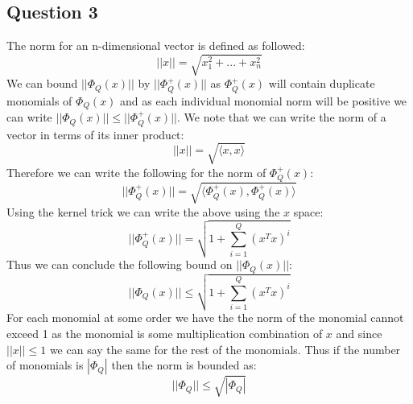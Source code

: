 \documentclass{article}
\begin{document}
\subsection{Question 3}
The norm for an n-dimensional vector is defined as followed:
$$
|| x || = \sqrt{x_1^2 + ... + x_n^2}
$$
We can bound $||\Phi_Q(x)||$ by $||\Phi^+_Q(x)||$ as $\Phi^+_Q(x)$ will contain duplicate monomials of $\Phi_Q(x)$ and as each individual monomial norm will be positive we can write $||\Phi_Q(x)|| \leq ||\Phi^+_Q(x)||$. We note that we can write the norm of a vector in terms of its inner product:
\begin{equation}
||x|| = \sqrt{\langle x, x \rangle}
\end{equation}
Therefore we can write the following for the norm of $\Phi^+_Q(x)$:
\begin{equation}
||\Phi^+_Q(x)|| = \sqrt{ \langle \Phi^+_Q(x), \Phi^+_Q(x) \rangle}
\end{equation}
Using the kernel trick we can write the above using the $x$ space:
\begin{equation}
||\Phi^+_Q(x)|| = \sqrt{1+ \sum\limits_{i=1}^Q (x^Tx)^i}
\end{equation}
Thus we can conclude the following bound on $||\Phi_Q(x)||$:
\begin{equation}
||\Phi_Q(x)|| \leq \sqrt{1+ \sum\limits_{i=1}^Q (x^Tx)^i}
\end{equation}
For each monomial at some order we have the the norm of the monomial cannot exceed 1 as the monomial is some multiplication combination of $x$ and since $||x|| \leq 1$ we can say the same for the rest of the monomials. Thus if the number of monomials is $|\Phi_Q|$ then the norm is bounded as:
\begin{equation}
||\Phi_Q|| \leq \sqrt{| \Phi_Q|}
\end{equation}
\end{document}
